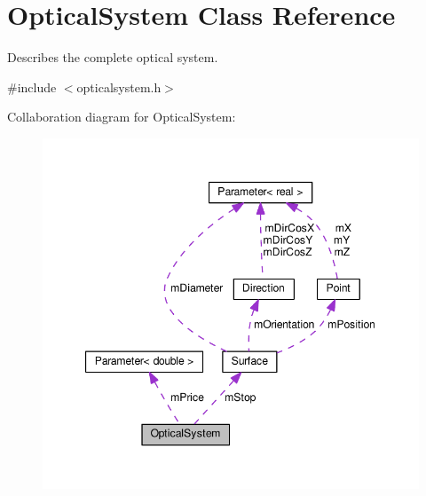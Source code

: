 \hypertarget{classOpticalSystem}{}\section{Optical\+System Class Reference}
\label{classOpticalSystem}


Describes the complete optical system.  




{\ttfamily \#include $<$opticalsystem.\+h$>$}



Collaboration diagram for Optical\+System\+:
\nopagebreak
\begin{figure}[H]
\begin{center}
\leavevmode
\includegraphics[width=347pt]{classOpticalSystem__coll__graph}
\end{center}
\end{figure}
